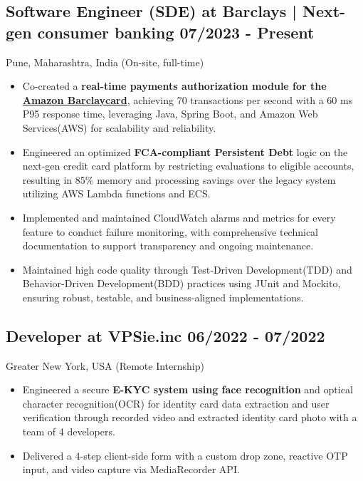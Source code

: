 \documentclass[a4,10pt]{article}
\newcommand{\subtext}[1]{
#1\par\vspace{-0.2cm}}
\newenvironment{zitemize}{
\begin{itemize}\itemsep0pt \parskip0pt \parsep1pt}
{\end{itemize}\vspace{-0.5cm}}
\begin{document}
\subsection*{Software Engineer (SDE) at Barclays | Next-gen consumer banking \hfill 07/2023 - Present} 
\subtext{Pune, Maharashtra, India {\normalsize\normalfont (On-site, full-time) }} 
    \begin{zitemize}
        \item Co-created a \textbf{real-time payments authorization module for the \href{https://www.amazon.co.uk/dp/B0BH98211K}{Amazon Barclaycard}}, achieving 70 transactions per second with a 60 ms P95 response time, leveraging Java, Spring Boot, and Amazon Web Services(AWS) for scalability and reliability.
        \item Engineered an optimized \textbf{FCA-compliant Persistent Debt} logic on the next-gen credit card platform by restricting evaluations to eligible accounts, resulting in 85\% memory and processing savings over the legacy system utilizing AWS Lambda functions and ECS.
        \item Implemented and maintained CloudWatch alarms and metrics for every feature to conduct failure monitoring, with comprehensive technical documentation to support transparency and ongoing maintenance.
        \item Maintained high code quality through Test‑Driven Development(TDD) and Behavior-Driven Development(BDD) practices using JUnit and Mockito, ensuring robust, testable, and business-aligned implementations.

    \end{zitemize}

\subsection*{Developer at VPSie.inc \hfill 06/2022 - 07/2022} 
\subtext{Greater New York, USA {\normalsize\normalfont (Remote Internship) }} 
    \begin{zitemize}
        \item Engineered a secure \textbf{E-KYC system using face recognition} and optical character recognition(OCR) for identity card data extraction and user verification through recorded video and extracted identity card photo with a team of 4 developers.
        \item Delivered a 4-step client-side form with a custom drop zone, reactive OTP input, and video capture via MediaRecorder API.
    \end{zitemize}
\end{document}
